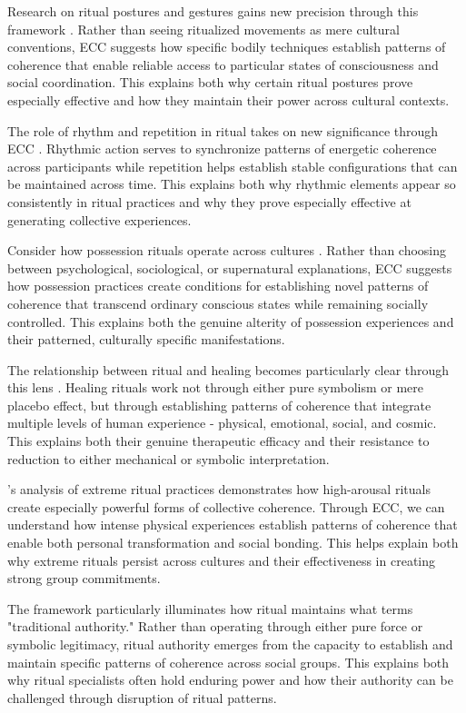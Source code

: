 Research on ritual postures and gestures gains new precision through this framework \cite{kapferer1997feast}. Rather than seeing ritualized movements as mere cultural conventions, ECC suggests how specific bodily techniques establish patterns of coherence that enable reliable access to particular states of consciousness and social coordination. This explains both why certain ritual postures prove especially effective and how they maintain their power across cultural contexts.

The role of rhythm and repetition in ritual takes on new significance through ECC \cite{mcneill1995keeping}. Rhythmic action serves to synchronize patterns of energetic coherence across participants while repetition helps establish stable configurations that can be maintained across time. This explains both why rhythmic elements appear so consistently in ritual practices and why they prove especially effective at generating collective experiences.

Consider how possession rituals operate across cultures \cite{houseman1998naven}. Rather than choosing between psychological, sociological, or supernatural explanations, ECC suggests how possession practices create conditions for establishing novel patterns of coherence that transcend ordinary conscious states while remaining socially controlled. This explains both the genuine alterity of possession experiences and their patterned, culturally specific manifestations.

The relationship between ritual and healing becomes particularly clear through this lens \cite{kapferer1997feast}. Healing rituals work not through either pure symbolism or mere placebo effect, but through establishing patterns of coherence that integrate multiple levels of human experience - physical, emotional, social, and cosmic. This explains both their genuine therapeutic efficacy and their resistance to reduction to either mechanical or symbolic interpretation.

\cite{xygalatas2013burning}'s analysis of extreme ritual practices demonstrates how high-arousal rituals create especially powerful forms of collective coherence. Through ECC, we can understand how intense physical experiences establish patterns of coherence that enable both personal transformation and social bonding. This helps explain both why extreme rituals persist across cultures and their effectiveness in creating strong group commitments.

The framework particularly illuminates how ritual maintains what \cite{bloch1989ritual} terms "traditional authority." Rather than operating through either pure force or symbolic legitimacy, ritual authority emerges from the capacity to establish and maintain specific patterns of coherence across social groups. This explains both why ritual specialists often hold enduring power and how their authority can be challenged through disruption of ritual patterns.

